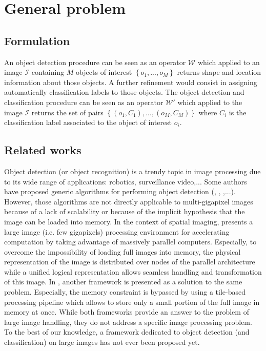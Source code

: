 \label{chap:context}
\section{General problem}
\subsection{Formulation}
An object detection procedure can be seen as an operator $\mathcal{W}$ which applied to an image $\mathcal{I}$ containing $M$ objects of interest $\left\{o_1,...,o_M\right\}$ returns shape and location information about those objects. A further refinement would consist in assigning automatically classification labels to those objects. The object detection and classification procedure can be seen as an operator $\mathcal{W}'$ which applied to the image $\mathcal{I}$ returns the set of pairs $\left\{\left(o_1, C_1\right), ..., \left(o_M, C_M\right)\right\}$ where $C_i$ is the classification label associated to the object of interest $o_i$. 

\subsection{Related works}
Object detection (or object recognition) is a trendy topic in image processing due to its wide range of applications: robotics, surveillance video,...  Some authors have proposed generic algorithms for performing object detection (\cite{lecun2004learning}, \cite{opelt2006generic}, \cite{wang2013regionlets},...). However, those algorithms are not directly applicable to multi-gigapixel images because of a lack of scalability or because of the implicit hypothesis that the image can be loaded into memory. In the context of spatial imaging, \cite{jones2003gigapixel} presents a large image (i.e. few gigapixels) processing environment for accelerating computation by taking advantage of massively parallel computers. Especially, to overcome the impossibility of loading full images into memory, the physical representation of the image is distributed over nodes of the parallel architecture while a unified logical representation allows seamless handling and transformation of this image. In \cite{powell2010scalable}, another framework is presented as a solution to the same problem. Especially, the memory constraint is bypassed by using a tile-based processing pipeline which allows to store only a small portion of the full image in memory at once. While both frameworks provide an answer to the problem of large image handling, they do not address a specific image processing problem. To the best of our knowledge, a framework dedicated to object detection (and classification) on large images has not ever been proposed yet.

